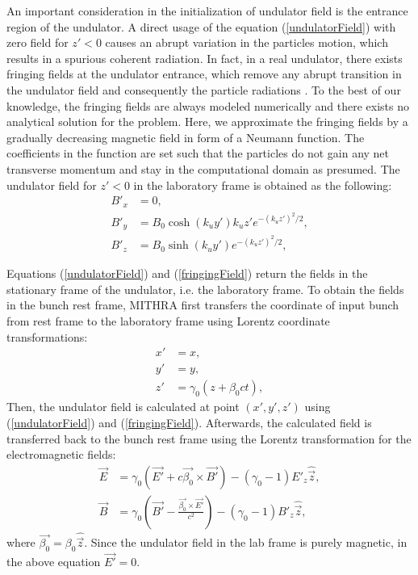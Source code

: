 An important consideration in the initialization of undulator field is the entrance region of the undulator.
%
A direct usage of the equation (\ref{undulatorField}) with zero field for $z'<0$ causes an abrupt variation in the particles motion, which results in a spurious coherent radiation.
%
In fact, in a real undulator, there exists fringing fields at the undulator entrance, which remove any abrupt transition in the undulator field and consequently the particle radiations  \cite{sagan2003magnetic}.
%
To the best of our knowledge, the fringing fields are always modeled numerically and there exists no analytical solution for the problem.
%
Here, we approximate the fringing fields by a gradually decreasing magnetic field in form of a Neumann function.
%
The coefficients in the function are set such that the particles do not gain any net transverse momentum and stay in the computational domain as presumed.
%
The undulator field for $z'<0$ in the laboratory frame is obtained as the following:
%
\begin{align}
B'_x & = 0, \nonumber \\
B'_y & = B_0 \cosh(k_uy')k_uz'e^{-(k_uz')^2/2}, \label{fringingField} \\
B'_z & = B_0 \sinh(k_uy')e^{-(k_uz')^2/2}, \nonumber
\end{align}

Equations (\ref{undulatorField}) and (\ref{fringingField}) return the fields in the stationary frame of the undulator, i.e. the laboratory frame.
%
To obtain the fields in the bunch rest frame, MITHRA first transfers the coordinate of input bunch from rest frame to the laboratory frame using Lorentz coordinate transformations:
%
\begin{align}
x' & = x, \nonumber \\
y' & = y, \label{LorentzTransformR2L} \\
z' & = \gamma_0(z+\beta_0ct), \nonumber
\end{align}
%
Then, the undulator field is calculated at point $(x',y',z')$ using (\ref{undulatorField}) and (\ref{fringingField}).
%
Afterwards, the calculated field is transferred back to the bunch rest frame using the Lorentz transformation for the electromagnetic fields:
%
\begin{align}
\label{LorentzTransformElectric}
\vec{E} & = \gamma_0 (\vec{E'}+c\vec{\beta_0} \times \vec{B'}) - (\gamma_0 - 1) E'_z \hat{\vec{z}}, \\
\label{LorentzTransformMagnetic}
\vec{B} & = \gamma_0 (\vec{B'}-\frac{\vec{\beta_0} \times \vec{E'}}{c^2}) - (\gamma_0 - 1) B'_z \hat{\vec{z}},
\end{align}
%
where $\vec{\beta_0}=\beta_0\hat{\vec{z}}$. Since the undulator field in the lab frame is purely magnetic, in the above equation $\vec{E'}=0$.

